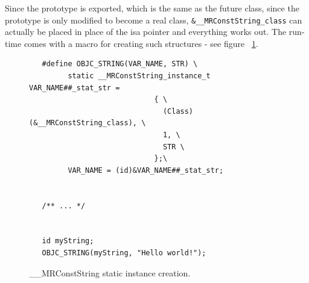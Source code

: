 Since the prototype is exported, which is the same as the future class, since the prototype is only modified to become a real class, \verb=&__MRConstString_class= can actually be placed in place of the isa pointer and everything works out. The run-time comes with a macro for creating such structures - see figure ~\ref{fig:mr_const_str_creation}.

\begin{figure}[H]
  \begin{verbatim}
   #define OBJC_STRING(VAR_NAME, STR) \
         static __MRConstString_instance_t VAR_NAME##_stat_str = 
                             { \
                               (Class)(&__MRConstString_class), \
                               1, \
                               STR \
                             };\
         VAR_NAME = (id)&VAR_NAME##_stat_str;


   /** ... */
   
 
   id myString;
   OBJC_STRING(myString, "Hello world!");
   \end{verbatim}
  \centering{}
  \caption{\_\_MRConstString static instance creation.}
  \label{fig:mr_const_str_creation}
\end{figure}


